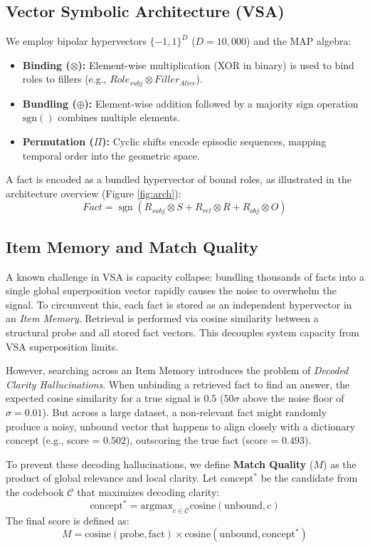 \documentclass[11pt,letterpaper]{article}
\begin{document}
\subsection{Vector Symbolic Architecture (VSA)}
We employ bipolar hypervectors $\{-1, 1\}^D$ ($D=10{,}000$) and the MAP algebra:
\begin{itemize}
    \item \textbf{Binding ($\otimes$):} Element-wise multiplication (XOR in binary) is used to bind roles to fillers (e.g., $Role_{subj} \otimes Filler_{Alice}$).
    \item \textbf{Bundling ($\oplus$):} Element-wise addition followed by a majority sign operation $\text{sgn}()$ combines multiple elements.
    \item \textbf{Permutation ($\Pi$):} Cyclic shifts encode episodic sequences, mapping temporal order into the geometric space.
\end{itemize}

A fact is encoded as a bundled hypervector of bound roles, as illustrated in the architecture overview (Figure \ref{fig:arch}):
\begin{equation}
    Fact = \operatorname{sgn}(R_{subj}\otimes S + R_{rel}\otimes R + R_{obj}\otimes O)
\end{equation}

\subsection{Item Memory and Match Quality}
A known challenge in VSA is capacity collapse: bundling thousands of facts into a single global superposition vector rapidly causes the noise to overwhelm the signal. To circumvent this, each fact is stored as an independent hypervector in an \textit{Item Memory}. Retrieval is performed via cosine similarity between a structural probe and all stored fact vectors. This decouples system capacity from VSA superposition limits.

However, searching across an Item Memory introduces the problem of \textit{Decoded Clarity Hallucinations}. When unbinding a retrieved fact to find an answer, the expected cosine similarity for a true signal is $0.5$ ($50\sigma$ above the noise floor of $\sigma=0.01$). But across a large dataset, a non-relevant fact might randomly produce a noisy, unbound vector that happens to align closely with a dictionary concept (e.g., score = $0.502$), outscoring the true fact (score = $0.493$).

To prevent these decoding hallucinations, we define \textbf{Match Quality} ($M$) as the product of global relevance and local clarity. Let $\text{concept}^*$ be the candidate from the codebook $\mathcal{C}$ that maximizes decoding clarity:
\begin{equation}
    \text{concept}^* = \text{argmax}_{c \in \mathcal{C}} \text{cosine}(\text{unbound}, c)
\end{equation}
The final score is defined as:
\begin{equation}
    M = \text{cosine}(\text{probe}, \text{fact}) \times \text{cosine}(\text{unbound}, \text{concept}^*)
\end{equation}
\end{document}
